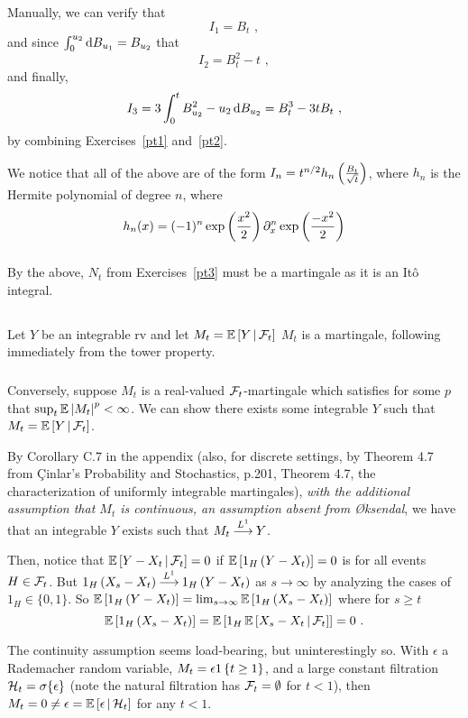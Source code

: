 \documentclass{article}
\begin{document}
\subsubsection{}

Manually, we can verify that
\[
I_1=B_t\,\,,
\]
and since \(\int_0^{u_2}\mathop{\mathrm{d} B_{u_1} }=B_{u_2}\) that
\[
  I_2=B_t^2-t\,\,,
\]
and finally,
\[
  I_3=3 \int_0^{t}B_{u_2}^2-u_2\mathop{\mathrm{d} B_{u_2} }=B_t^3-3tB_t\,\,,
\]
by combining Exercises~\ref{pt1} and~\ref{pt2}.

We notice that all of the above are of the form \(I_n=t^{n/2}h_n\left({\frac{B_t}{\sqrt{t}}}\right)\), where \(h_n\) is the Hermite polynomial of degree \(n\), where
\[
  h_n(x)=(-1)^n\exp\left({\frac{x^2}{2}}\right)\partial_x^n\exp\left({\frac{-x^2}{2}}\right)
\]
\subsubsection{}

By the above, \(N_t\) from Exercises~\ref{pt3} must be a martingale as it is an It\^{o} integral.

\subsection{}


\subsubsection{}
Let \(Y\) be an integrable rv and let \(M_t=\operatorname{\mathbb{E}}\left[ Y \,\middle|\, \mathcal{F}_t \right]\)
\(M_t\) is a martingale, following immediately from the tower property.
\subsubsection{}
Conversely, suppose \(M_t\) is a real-valued \(\mathcal{F}_t\)-martingale which satisfies for some \(p\) that \(\sup_t\operatorname{\mathbb{E}}\left\lvert{M_t}\right\rvert^p<\infty\). We can show there exists some integrable \(Y\) such that \(M_t=\operatorname{\mathbb{E}}\left[ Y \,\middle|\, \mathcal{F}_t \right]\).

By Corollary C.7 in the appendix (also, for discrete settings, by Theorem 4.7 from \c{C}inlar's Probability and Stochastics,  p.201, Theorem 4.7, the characterization of uniformly integrable martingales), {\em with the additional assumption that \(M_t\) is continuous, an assumption absent from {\O}ksendal}, we have that an integrable \(Y\) exists such that \(M_t\mathbin{\overset{ L^1 }{\longrightarrow}}Y\).

Then, notice that \(\operatorname{\mathbb{E}}\left[ Y-X_t \,\middle|\, \mathcal{F}_t \right]=0\) if \(\operatorname{\mathbb{E}}\left[{1_H\left({Y-X_t}\right)}\right]=0\) is for all events \(H\in \mathcal{F}_t\).
But \(1_H\left({X_s-X_t}\right)\mathbin{\overset{ L^1 }{\longrightarrow}}1_H\left({Y-X_t}\right)\) as \(s\rightarrow\infty\) by analyzing the cases of \(1_H\in\{0,1\}\). So \(\operatorname{\mathbb{E}}\left[{1_H\left({Y-X_t}\right)}\right]=\lim_{s\rightarrow\infty}\operatorname{\mathbb{E}}\left[{1_H\left({X_s-X_t}\right)}\right]\) where for \(s\ge t\)
\[
  \operatorname{\mathbb{E}}\left[{1_H\left({X_s-X_t}\right)}\right]=\operatorname{\mathbb{E}} \left[{1_H\operatorname{\mathbb{E}}\left[ X_s-X_t \,\middle|\, \mathcal{F}_t \right]}\right]=0\,\,.
\]

The continuity assumption seems load-bearing, but uninterestingly so. With \(\epsilon\) a Rademacher random variable, \(M_t=\epsilon 1\left\{{t\ge 1}\right\}\), and a large constant filtration \(\mathcal{H}_t=\sigma\{\epsilon\}\) (note the natural filtration has \(\mathcal{F}_t=\emptyset\) for \(t<1\)), then \(M_t=0\neq \epsilon=\operatorname{\mathbb{E}}\left[ \epsilon \,\middle|\, \mathcal{H}_{t} \right]\) for any \(t<1\).
\end{document}
